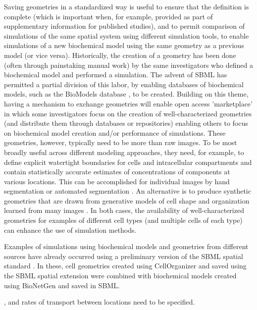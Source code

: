 Saving geometries in a standardized way is useful to ensure that the definition is complete (which is important when, for example, provided as part of supplementary information for published studies), and to permit comparison of simulations of the same spatial system using different simulation tools, to enable simulations of a new biochemical model using the same geometry as a previous model (or vice versa). Historically, the creation of a geometry has been done (often through painstaking manual work) by the same investigators who defined a biochemical model and performed a simulation. The advent of SBML has permitted a partial division of this labor, by enabling databases of biochemical models, such as the BioModels database \citep{lenovere:2006, li:2010, malik:2020}, to be created. Building on this theme, having a mechanism to exchange geometries will enable  open access 'marketplace' in which some investigators focus on the creation of well-characterized geometries (and distribute them through databases or repositories) enabling others to focus on biochemical model creation and/or performance of simulations. These geometries, however, typically need to be more than raw images. To be most broadly useful across different modeling approaches, they need, for example, to define explicit watertight boundaries for cells and intracellular compartments and contain statistically accurate estimates of concentrations of components at various locations. This can be accomplished for individual images by hand segmentation \citep{loew:2001} or automated segmentation \citep{perez:2014}. An alternative is to produce synthetic geometries that are drawn from generative models of cell shape and organization learned from many images \citep{zhao:2007}. In both cases, the availability of well-characterized geometries for examples of different cell types (and multiple cells of each type) can enhance the use of simulation methods.

Examples of simulations using biochemical models and geometries from different sources have already occurred using a preliminary version of the SBML spatial standard \citep{sullivan:2015, donovan:2016}. In these, cell geometries created using CellOrganizer and saved using the SBML spatial extension were combined with biochemical models created using BioNetGen and saved in SBML.

, and rates of transport between locations need to be specified.

